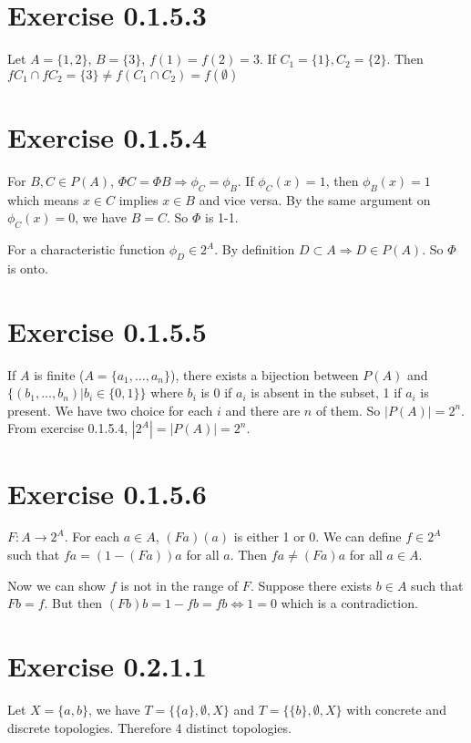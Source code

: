 \documentclass[12pt]{article}
\begin{document}
\section*{Exercise 0.1.5.3}
Let $A = \{1, 2\}$, $B =\{3\}$,  $f(1) = f(2) = 3$. If $C_1 = \{1\}, C_2=\{2\}$. Then $fC_1 \cap fC_2 = \{3\} \neq f(C_1 \cap C_2) = f (\emptyset)$

\section*{Exercise 0.1.5.4}
For $B, C \in P(A)$, $\Phi C = \Phi B \Rightarrow \phi_C = \phi_B$. If $\phi_C (x) = 1$,  then $\phi_B(x) = 1$ which means $x \in C$ implies $x \in B$ and vice versa. By the same argument on $\phi_C(x) = 0$, we have $B = C$. So $\Phi$ is 1-1.

For a characteristic function $\phi_D \in 2^A$. By definition $D \subset A \Rightarrow D \in P(A)$. So $\Phi$ is onto. 


\section*{Exercise 0.1.5.5}
If $A$ is finite ($A =\{a_1, \ldots, a_n \}$), there exists a bijection between $P(A)$ and $\{(b_1, \ldots, b_n) | b_i \in \{0, 1\} \}$ where $b_i$ is 0 if $a_i$ is absent in the subset, 1 if $a_i$ is present. We have two choice for each $i$ and there are $n$ of them. So $|P(A)| = 2^n$. From exercise 0.1.5.4, $|2^A| = |P(A)| = 2^n$.

\section*{Exercise 0.1.5.6}
$F: A \rightarrow 2^A$. For each $a \in A$, $(Fa)(a)$ is either 1 or 0. We can define $f \in 2^A$ such that $fa = (1 - (Fa)) a$ for all $a$. Then $fa \neq (Fa)a$ for all $a \in A$.

Now we can show $f$ is not in the range of $F$. Suppose there exists $b \in A$ such that $Fb = f$. But then $(Fb) b = 1 - fb = fb \Leftrightarrow 1 = 0$ which is a contradiction.


\section*{Exercise 0.2.1.1}
Let $X = \{a, b\}$, we have $T=\{\{a\}, \emptyset, X\}$ and $T=\{\{b\}, \emptyset, X\}$ with concrete and discrete topologies. Therefore 4 distinct topologies. \QED
\end{document}
